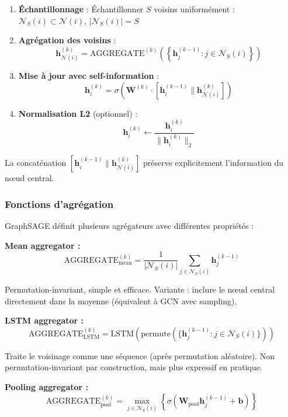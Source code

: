 \begin{enumerate}
    \item \textbf{Échantillonnage} : Échantillonner $S$ voisins uniformément : $\mathcal{N}_S(i) \subset \mathcal{N}(i)$, $|\mathcal{N}_S(i)| = S$
    
    \item \textbf{Agrégation des voisins} :
    \[
    \mathbf{h}_{\mathcal{N}(i)}^{(k)} = \text{AGGREGATE}^{(k)}\left(\left\{\mathbf{h}_j^{(k-1)} : j \in \mathcal{N}_S(i)\right\}\right)
    \]
    
    \item \textbf{Mise à jour avec self-information} :
    \[
    \mathbf{h}_i^{(k)} = \sigma\left(\mathbf{W}^{(k)} \cdot [\mathbf{h}_i^{(k-1)} \| \mathbf{h}_{\mathcal{N}(i)}^{(k)}]\right)
    \]
    
    \item \textbf{Normalisation L2} (optionnel) :
    \[
    \mathbf{h}_i^{(k)} \leftarrow \frac{\mathbf{h}_i^{(k)}}{\|\mathbf{h}_i^{(k)}\|_2}
    \]
\end{enumerate}

La concaténation $[\mathbf{h}_i^{(k-1)} \| \mathbf{h}_{\mathcal{N}(i)}^{(k)}]$ préserve explicitement l'information du nœud central.

\subsubsection{Fonctions d'agrégation}

GraphSAGE définit plusieurs agrégateurs avec différentes propriétés :

\textbf{Mean aggregator :}
\[
\text{AGGREGATE}_{\text{mean}}^{(k)} = \frac{1}{|\mathcal{N}_S(i)|}\sum_{j \in \mathcal{N}_S(i)} \mathbf{h}_j^{(k-1)}
\]

Permutation-invariant, simple et efficace. Variante : inclure le nœud central directement dans la moyenne (équivalent à GCN avec sampling).

\textbf{LSTM aggregator :}
\[
\text{AGGREGATE}_{\text{LSTM}}^{(k)} = \text{LSTM}\left(\text{permute}(\{\mathbf{h}_j^{(k-1)} : j \in \mathcal{N}_S(i)\})\right)
\]

Traite le voisinage comme une séquence (après permutation aléatoire). Non permutation-invariant par construction, mais plus expressif en pratique.

\textbf{Pooling aggregator :}
\[
\text{AGGREGATE}_{\text{pool}}^{(k)} = \max_{j \in \mathcal{N}_S(i)} \left\{\sigma\left(\mathbf{W}_{\text{pool}}\mathbf{h}_j^{(k-1)} + \mathbf{b}\right)\right\}
\]

